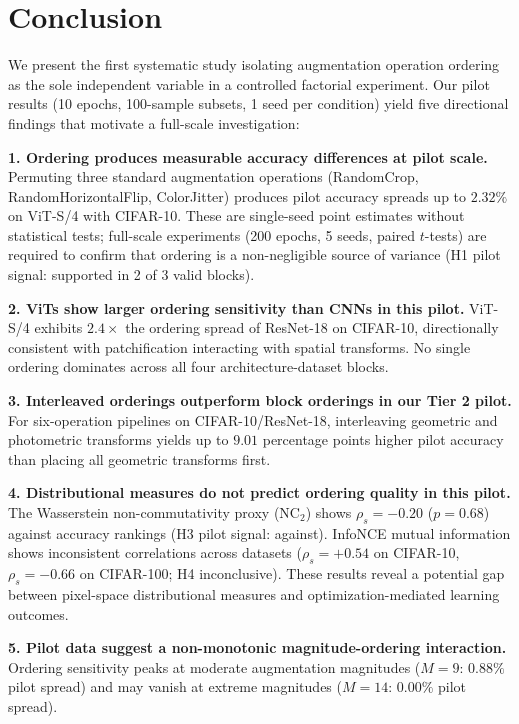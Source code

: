 \documentclass{article}
\begin{document}
\section{Conclusion}

We present the first systematic study isolating augmentation operation ordering as the sole independent variable in a controlled factorial experiment. Our pilot results (10 epochs, 100-sample subsets, 1 seed per condition) yield five directional findings that motivate a full-scale investigation:

\textbf{1. Ordering produces measurable accuracy differences at pilot scale.} Permuting three standard augmentation operations (RandomCrop, RandomHorizontalFlip, ColorJitter) produces pilot accuracy spreads up to $2.32\%$ on ViT-S/4 with CIFAR-10. These are single-seed point estimates without statistical tests; full-scale experiments (200 epochs, 5 seeds, paired $t$-tests) are required to confirm that ordering is a non-negligible source of variance (H1 pilot signal: supported in 2 of 3 valid blocks).

\textbf{2. ViTs show larger ordering sensitivity than CNNs in this pilot.} ViT-S/4 exhibits $2.4\times$ the ordering spread of ResNet-18 on CIFAR-10, directionally consistent with patchification interacting with spatial transforms. No single ordering dominates across all four architecture-dataset blocks.

\textbf{3. Interleaved orderings outperform block orderings in our Tier 2 pilot.} For six-operation pipelines on CIFAR-10/ResNet-18, interleaving geometric and photometric transforms yields up to $9.01$ percentage points higher pilot accuracy than placing all geometric transforms first.

\textbf{4. Distributional measures do not predict ordering quality in this pilot.} The Wasserstein non-commutativity proxy (NC$_2$) shows $\rho_s = -0.20$ ($p = 0.68$) against accuracy rankings (H3 pilot signal: against). InfoNCE mutual information shows inconsistent correlations across datasets ($\rho_s = +0.54$ on CIFAR-10, $\rho_s = -0.66$ on CIFAR-100; H4 inconclusive). These results reveal a potential gap between pixel-space distributional measures and optimization-mediated learning outcomes.

\textbf{5. Pilot data suggest a non-monotonic magnitude-ordering interaction.} Ordering sensitivity peaks at moderate augmentation magnitudes ($M=9$: $0.88\%$ pilot spread) and may vanish at extreme magnitudes ($M=14$: $0.00\%$ pilot spread).
\end{document}

